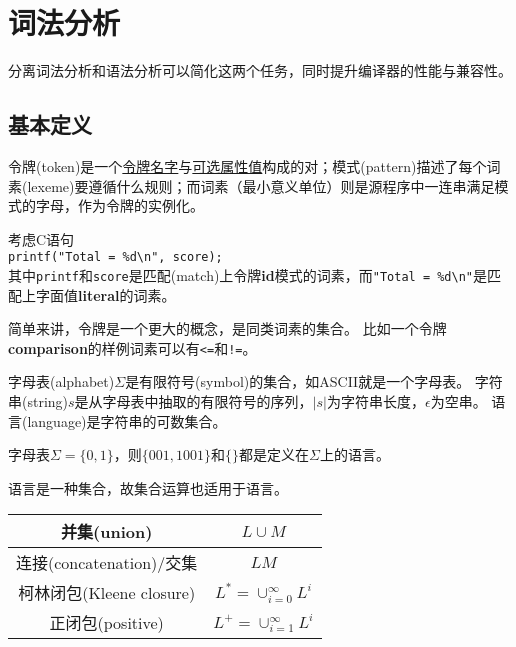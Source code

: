 
\section{词法分析}
分离词法分析和语法分析可以简化这两个任务，同时提升编译器的性能与兼容性。

\subsection{基本定义}
\begin{definition}
令牌(token)是一个\underline{令牌名字}与\underline{可选属性值}构成的对；模式(pattern)描述了每个词素(lexeme)要遵循什么规则；而词素（最小意义单位）则是源程序中一连串满足模式的字母，作为令牌的实例化。
\end{definition}
\begin{example}
考虑C语句\\
 \qquad\qquad\verb'printf("Total = %d\n", score);'\\
其中\verb'printf'和\verb'score'是匹配(match)上令牌\textbf{id}模式的词素，而\verb'"Total = %d\n"'是匹配上字面值\textbf{literal}的词素。
\end{example}
简单来讲，令牌是一个更大的概念，是同类词素的集合。
比如一个令牌\textbf{comparison}的样例词素可以有\texttt{<=}和\texttt{!=}。

\begin{definition}[字母表与语言]
字母表(alphabet)$\Sigma$是有限符号(symbol)的集合，如ASCII就是一个字母表。
字符串(string)$s$是从字母表中抽取的有限符号的序列，$|s|$为字符串长度，$\epsilon$为空串。
语言(language)是字符串的可数集合。
\end{definition}
\begin{example}
字母表$\Sigma=\{0,1\}$，则$\{001,1001\}$和$\{\}$都是定义在$\Sigma$上的语言。
\end{example}

语言是一种集合，故集合运算也适用于语言。
\begin{table}[H]
\centering
\begin{tabular}{|c|c|}\hline
并集(union) & $L\cup M$\\\hline
连接(concatenation)/交集 & $LM$\\\hline
柯林闭包(Kleene closure) & $L^*=\cup_{i=0}^\infty L^i$\\\hline
正闭包(positive) & $L^+=\cup_{i=1}^\infty L^i$\\\hline
\end{tabular}
\end{table}


